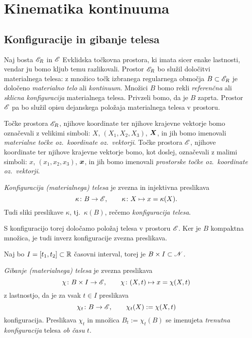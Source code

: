 \chapter{Kinematika kontinuuma} \label{chp:kinkon}


\section{Konfiguracije in gibanje telesa}


Naj bosta $\mathscr E_R$ in $\mathscr E$ Evklidska točkovna prostora, ki imata sicer enake lastnosti,
vendar ju bomo kljub temu razlikovali. Prostor $\mathscr E_R$ bo služil določitvi materialnega
telesa: z množico točk izbranega regularnega območja $B\subset\mathscr E_R$ je določeno \emph{materialno
telo} ali \emph{kontinuum}. Množici $B$ bomo rekli \emph{referenčna} ali \emph{sklicna konfiguracija}
materialnega telesa. Privzeli bomo, da je $B$ zaprta.
Prostor $\mathscr E$ pa bo služil opisu dejanskega položaja materialnega telesa v prostoru.

Točke prostora $\mathscr E_R$, njihove koordinate ter njihove krajevne vektorje bomo označevali
z velikimi simboli: $X$, $(X_1,X_2,X_3)$, $\boldsymbol X$, in jih bomo imenovali
\emph{materialne točke oz.~koordinate oz.~vektorji}.
Točke prostora $\mathscr E$, njihove koordinate ter njihove krajevne vektorje bomo,
kot doslej, označevali z malimi simboli: $x$, $(x_1,x_2,x_3)$, $\boldsymbol x$, in jih bomo imenovali
\emph{prostorske točke oz.~koordinate oz.~vektorji}.

\begin{definicija}
	\emph{Konfiguracija (materialnega) telesa} je zvezna in injektivna preslikava
	\[ \kappa\colon B\to\mathscr E,\qquad \kappa\colon X\mapsto x=\kappa(X). \]
	Tudi sliki preslikave $\kappa$, tj.~$\kappa(B)$, rečemo \emph{konfiguracija telesa}.
\end{definicija}
S konfiguracijo torej določamo položaj telesa v prostoru $\mathscr E$. Ker je $B$ kompaktna
množica, je tudi inverz konfiguracije zvezna preslikava.

Naj bo $I=[t_1,t_2]\subset\mathbb R$ časovni interval, torej je $B\times I\subset\mathscr N$.
\begin{definicija}
	\emph{Gibanje (materialnega) telesa} je zvezna preslikava
	\begin{equation}\label{e:chi}
		\chi\colon B\times I\to\mathscr E,\qquad \chi\colon(X,t)\mapsto x=\chi(X,t)
	\end{equation}
	z lastnostjo, da je za vsak $t\in I$ preslikava
	\[ \chi_t\colon B\to\mathscr E, \qquad \chi_t(X):=\chi(X,t) \]
	konfiguracija. Preslikava $\chi_t$ in množica $ B_t:=\chi_t(B)$ se imenujeta
	\emph{trenutna konfiguracija} telesa \emph{ob času} $t$.
\end{definicija}

